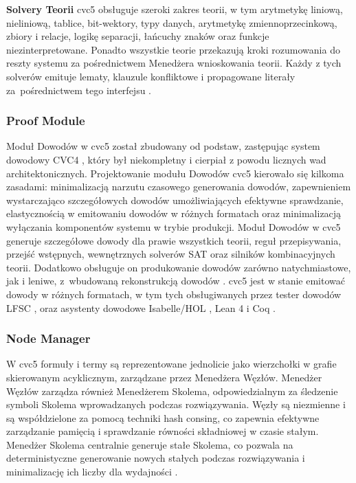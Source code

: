 \textbf{Solvery Teorii} cvc5 obsługuje szeroki zakres teorii, w tym arytmetykę liniową, nieliniową, tablice, bit-wektory, typy danych, arytmetykę zmiennoprzecinkową, zbiory i relacje, logikę separacji, łańcuchy znaków oraz funkcje niezinterpretowane. Ponadto wszystkie teorie przekazują kroki rozumowania do reszty systemu za pośrednictwem Menedżera wnioskowania teorii. Każdy z tych solverów emituje lematy, klauzule konfliktowe i propagowane literały za~pośrednictwem tego interfejsu \cite{BarbosaBBKLMMMN22}.

\subsubsection{Proof Module} Moduł Dowodów w cvc5 został zbudowany od podstaw, zastępując system dowodowy CVC4 \cite{HadareanBRTD15}, który był niekompletny i cierpiał z powodu licznych wad architektonicznych. Projektowanie modułu Dowodów cvc5 kierowało się kilkoma zasadami: minimalizacją narzutu czasowego generowania dowodów, zapewnieniem wystarczająco szczegółowych dowodów umożliwiających efektywne sprawdzanie, elastycznością w emitowaniu dowodów w różnych formatach oraz minimalizacją wyłączania komponentów systemu w trybie produkcji. Moduł Dowodów w cvc5 generuje szczegółowe dowody dla prawie wszystkich teorii, reguł przepisywania, przejść wstępnych, wewnętrznych solverów SAT oraz silników kombinacyjnych teorii. Dodatkowo obsługuje on produkowanie dowodów zarówno natychmiastowe, jak i leniwe, z~wbudowaną rekonstrukcją dowodów \cite{ReynoldsWBBLT17}. cvc5 jest w stanie emitować dowody w różnych formatach, w tym tych obsługiwanych przez tester dowodów LFSC \cite{StumpORHT13}, oraz asystenty dowodowe Isabelle/HOL \cite{NipkowPW02}, Lean 4 \cite{Moura021} i Coq \cite{BertotC04}.

\subsubsection{Node Manager} W cvc5 formuły i termy są reprezentowane jednolicie jako wierzchołki w grafie skierowanym acyklicznym, zarządzane przez Menedżera Węzłów. Menedżer Węzłów zarządza również Menedżerem Skolema, odpowiedzialnym za śledzenie symboli Skolema wprowadzanych podczas rozwiązywania. Węzły są niezmienne i są współdzielone za pomocą techniki hash consing, co zapewnia efektywne zarządzanie pamięcią i sprawdzanie równości składniowej w czasie stałym. Menedżer Skolema centralnie generuje stałe Skolema, co pozwala na deterministyczne generowanie nowych stałych podczas rozwiązywania i minimalizację ich liczby dla wydajności \cite{ReynoldsNBT20}. 

